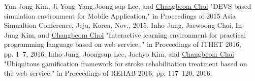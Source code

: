 \documentclass[english,full]{resume_structure}
\begin{document}
\begin{Publication}
{\begin{itemize}
   {Yun Jong Kim, Ji Yong Yang,Joong sup Lee, and \underline{Changbeom Choi} "DEVS based simulation environment for Mobile Application," in Proceedings of 2015 Asia Simualtion Conference, Jeju, Korea, Nov., 2015.}
   { Inho Jung, Jaewoong Choi, In-Jung Kim, and \underline{Changbeom Choi} "Interactive learning environment for practical programming language based on web service.," in Proceedings of ITHET 2016, pp. 1--7, 2016.}
   { Inho Jung, Joongsup Lee, Jaehyo Kim, and \underline{Changbeom Choi} "Ubiquitous gamification framework for stroke rehabilitation treatment based on the web service," in Proceedings of REHAB 2016, pp. 117--120, 2016.}
\end{itemize}
}
\end{Publication}

\end{document}
